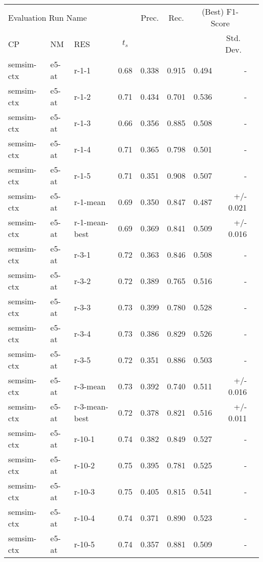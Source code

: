 \begin{table}[H]
\centering
\begin{tabular}{lllrrrrrr}
\toprule
\multicolumn{4}{l}{Evaluation Run Name} & \multicolumn{1}{c}{Prec.} & \multicolumn{1}{c}{Rec.} & \multicolumn{2}{c}{(Best) F1-Score}\\
\cmidrule{1-4}\cmidrule{7-8}
\multicolumn{1}{l}{CP} & \multicolumn{1}{l}{NM} & \multicolumn{1}{l}{RES} & \multicolumn{1}{c}{\(t_s\)} & \multicolumn{3}{l}{} & \multicolumn{1}{c}{Std. Dev.} \\
\midrule
semsim-ctx & e5-at & r-1-1 & 0.68 & 0.338 & 0.915 & 0.494 & - \\
semsim-ctx & e5-at & r-1-2 & 0.71 & 0.434 & 0.701 & 0.536 & - \\
semsim-ctx & e5-at & r-1-3 & 0.66 & 0.356 & 0.885 & 0.508 & - \\
semsim-ctx & e5-at & r-1-4 & 0.71 & 0.365 & 0.798 & 0.501 & - \\
semsim-ctx & e5-at & r-1-5 & 0.71 & 0.351 & 0.908 & 0.507 & - \\
semsim-ctx & e5-at & r-1-mean & 0.69 & 0.350 & 0.847 & 0.487 & +/- 0.021 \\
semsim-ctx & e5-at & r-1-mean-best & 0.69 & 0.369 & 0.841 & 0.509 & +/- 0.016 \\
\hline
semsim-ctx & e5-at & r-3-1 & 0.72 & 0.363 & 0.846 & 0.508 & - \\
semsim-ctx & e5-at & r-3-2 & 0.72 & 0.389 & 0.765 & 0.516 & - \\
semsim-ctx & e5-at & r-3-3 & 0.73 & 0.399 & 0.780 & 0.528 & - \\
semsim-ctx & e5-at & r-3-4 & 0.73 & 0.386 & 0.829 & 0.526 & - \\
semsim-ctx & e5-at & r-3-5 & 0.72 & 0.351 & 0.886 & 0.503 & - \\
semsim-ctx & e5-at & r-3-mean & 0.73 & 0.392 & 0.740 & 0.511 & +/- 0.016 \\
semsim-ctx & e5-at & r-3-mean-best & 0.72 & 0.378 & 0.821 & 0.516 & +/- 0.011 \\
\hline
semsim-ctx & e5-at & r-10-1 & 0.74 & 0.382 & 0.849 & 0.527 & - \\
semsim-ctx & e5-at & r-10-2 & 0.75 & 0.395 & 0.781 & 0.525 & - \\
semsim-ctx & e5-at & r-10-3 & 0.75 & 0.405 & 0.815 & 0.541 & - \\
semsim-ctx & e5-at & r-10-4 & 0.74 & 0.371 & 0.890 & 0.523 & - \\
semsim-ctx & e5-at & r-10-5 & 0.74 & 0.357 & 0.881 & 0.509 & - \\

\end{tabular}
\end{table}

